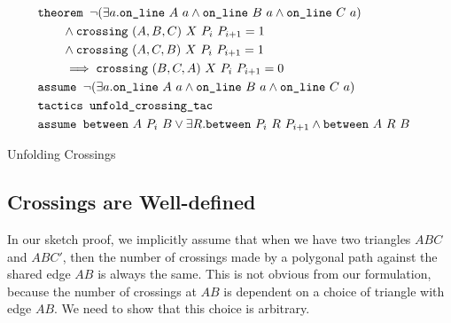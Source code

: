\begin{boxedfigure}
\small
\begin{align*}
&\texttt{theorem } \neg(\exists a.\texttt{on\_line}\ A\ a\wedge \texttt{on\_line}\ B\ a\wedge \texttt{on\_line}\ C\ a) &\\
&\qquad\wedge \texttt{crossing}\ (A,B,C)\ X\ P_i\ P_{i+1} = 1&\\
&\qquad\wedge \texttt{crossing}\ (A,C,B)\ X\ P_i\ P_{i+1} = 1&\\
&\qquad\implies \texttt{crossing}\ (B,C,A)\ X\ P_i\ P_{i+1} = 0&\\
&\texttt{assume } \neg(\exists a.\texttt{on\_line}\ A\ a\wedge \texttt{on\_line}\ B\ a\wedge \texttt{on\_line}\ C\ a)&\\
&\texttt{tactics } \texttt{unfold\_crossing\_tac}&\\
&\texttt{assume } \texttt{between}\ A\ P_i\ B \vee \exists R. \texttt{between}\ P_i\ R\ P_{i+1} \wedge \texttt{between}\ A\ R\ B
\end{align*}
\caption{Unfolding Crossings}
\label{fig:UnfoldingCrossings}
\end{boxedfigure}




\subsection{Crossings are Well-defined}\label{sec:CrossingsWellDefined}
In our sketch proof, we implicitly assume that when we have two triangles $ABC$ and $ABC'$, then the number of crossings made by a polygonal path against the shared edge $AB$ is always the same. This is not obvious from our formulation, because the number of crossings at $AB$ is dependent on a choice of triangle with edge $AB$. We need to show that this choice is arbitrary.

